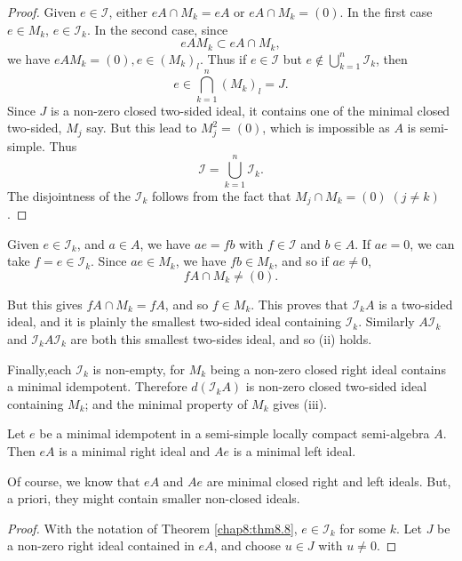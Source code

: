 \begin{proof}
  Given $e \in \mathscr{I}$, either $eA \cap M_k=eA$ or $eA \cap
  M_k=(0)$. In the first case $e \in M_k$, $e \in \mathscr{I}_k$. In the
  second case, since 
  $$
  eA M_k \subset eA \cap M_k,
  $$
  we have $eA M_k =(0),e \in (M_k)_l$. Thus if $e \in \mathscr{I}$ but
  $e \notin \bigcup\limits_{k=1}^n \mathscr{I}_k$, then 
  $$
  e \in \bigcap _{k=1}^n (M_k)_l=J.
  $$
  Since $J$ is a non-zero closed two-sided ideal, it contains one of
  the minimal closed two-sided, $M_j$ say. But this lead to
  $M_j^2=(0)$, which is impossible as $A$ is semi-simple. Thus  
  $$
  \mathscr{I}= \bigcup _{k=1}^n \mathscr{I}_k.
  $$
  The disjointness of the $\mathscr{I}_k$ follows from the fact that
  $M_j\cap M_k=(0) \; (j \neq k)$. 
\end{proof}

Given $e \in \mathscr{I}_k$, and $a \in A$, we have $ae=fb$ with $f
\in \mathscr{I}$ and $b \in A$. If $ae=0$, we can take $f=e \in
\mathscr{I}_k$. Since $ae \in M_k$, we have $fb \in M_k$, and so if
$ae \neq 0$, 
$$
fA \cap M_k \neq (0).
$$

But this gives $fA \cap M_k=fA$, and so $f \in M_k$. This proves that
$\mathscr{I}_k A$ is a two-sided ideal, and it is plainly the smallest
two-sided ideal containing $\mathscr{I}_k$. Similarly $A \mathscr{I}_k
$ and $\mathscr{I}_k A \mathscr{I}_k$ are both this smallest two-sides
ideal, and so (ii) holds. 

Finally,\pageoriginale each $\mathscr{I}_k$ is non-empty, for $M_k$
being a non-zero 
closed right ideal contains a minimal idempotent. Therefore
$d(\mathscr{I}_k A)$ is non-zero closed two-sided ideal containing
$M_k$; and the minimal property of $M_k$ gives (iii). 

\begin{thmm}%
  Let $e$ be a minimal idempotent in a semi-simple locally compact
  semi-algebra $A$. Then $eA$ is a minimal right ideal and $Ae$ is a
  minimal left ideal. 
\end{thmm}

\begin{remark*}%
  Of course, we know that $eA$ and $Ae$ are minimal closed right and
  left ideals. But, a priori, they might contain smaller non-closed
  ideals. 
\end{remark*}

\begin{proof}
  With the notation of Theorem \ref{chap8:thm8.8}, $e \in
  \mathscr{I}_k$ for some $k$. Let $J$ be a non-zero right ideal
  contained in $eA$, and choose $u \in J$ with $u \neq 0$.  
\end{proof}

